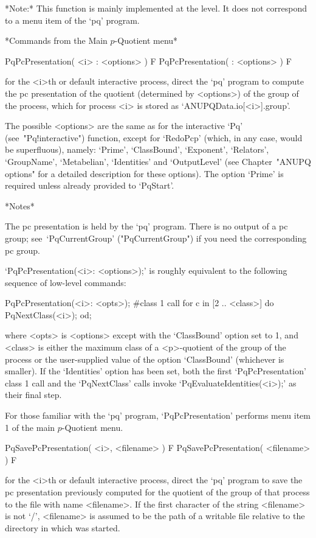 *Note:* This function is mainly implemented at the {\GAP} level. It  does
not correspond to a menu item of the `pq' program.

\goodbreak%
*Commands from the Main $p$-Quotient menu*

\>PqPcPresentation( <i> : <options> ) F
\>PqPcPresentation( : <options> ) F

for the <i>th or default interactive {\ANUPQ} process,  direct  the  `pq'
program to compute the pc presentation of  the  quotient  (determined  by
<options>) of the group of the process, which for process <i>  is  stored
as `ANUPQData.io[<i>].group'.

The  possible  <options>  are  the  same  as  for  the  interactive  `Pq'
(see~"Pq!interactive") function, except  for  `RedoPcp'  (which,  in  any
case, would be superfluous), namely: `Prime',  `ClassBound',  `Exponent',
`Relators', `GroupName',  `Metabelian',  `Identities'  and  `OutputLevel'
(see  Chapter~"ANUPQ  options"  for  a  detailed  description  for  these
options). The option `Prime'  is  required  unless  already  provided  to
`PqStart'.

*Notes* 

The pc presentation is held by the `pq' program. There is no output of  a
{\GAP} pc group; see~`PqCurrentGroup' ("PqCurrentGroup") if you need  the
corresponding {\GAP} pc group.

`PqPcPresentation(<i>:  <options>);'  is  roughly   equivalent   to   the
following sequence of low-level commands:

PqPcPresentation(<i>: <opts>); \#class 1 call
for c in [2 .. <class>] do
PqNextClass(<i>);
od;

where <opts> is <options> except with the `ClassBound' option set  to  1,
and <class> is either the maximum class of a <p>-quotient of the group of
the process  or  the  user-supplied  value  of  the  option  `ClassBound'
(whichever is smaller). If the `Identities' option has been set, both the
first `PqPcPresentation' class 1 call and the `PqNextClass' calls  invoke
`PqEvaluateIdentities(<i>);' as their final step.

For those familiar with the  `pq'  program,  `PqPcPresentation'  performs
menu item 1 of the main $p$-Quotient menu.

\>PqSavePcPresentation( <i>, <filename> ) F
\>PqSavePcPresentation( <filename> ) F

for the <i>th or default interactive {\ANUPQ} process,  direct  the  `pq'
program to save the pc presentation previously computed for  the  quotient
of the group of that process to the file with  name  <filename>.  If  the
first character of the  string  <filename>  is  not  `/',  <filename>  is
assumed to be the path of a writable file relative to  the  directory  in
which {\GAP} was started.

